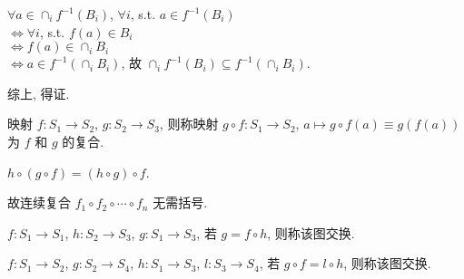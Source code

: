 \documentclass{note}
\begin{document}
\begin{itemize}
\begin{pf}
        $\forall a\in\cap_if^{-1}(B_i)$, $\forall i$, s.t. $a\in f^{-1}(B_i)$\\
        $\Longleftrightarrow\forall i$, s.t. $f(a)\in B_i$\\
        $\Longleftrightarrow f(a)\in\cap_iB_i$\\
        $\Longleftrightarrow a\in f^{-1}(\cap_iB_i)$, 故 $\cap_if^{-1}(B_i)\subseteq f^{-1}(\cap_iB_i)$.

        综上, 得证.
    \end{pf}
\end{itemize}

\begin{df}[映射的复合]
    映射 $f:S_1\rightarrow S_2$, $g:S_2\rightarrow S_3$, 则称映射 $g\circ f:S_1\rightarrow S_2$, $a\mapsto g\circ f(a)\equiv g(f(a))$ 为 $f$ 和 $g$ 的复合.
\end{df}

\begin{thm}[映射复合的结合律]
    $h\circ(g\circ f)=(h\circ g)\circ f$.
\end{thm}

故连续复合 $f_1\circ f_2\circ\cdots\circ f_n$ 无需括号.

\begin{df}[交换图]
    $f: S_1\rightarrow S_1$, $h:S_2\rightarrow S_3$, $g:S_1\rightarrow S_3$, 若 $g=f\circ h$, 则称该图交换.
    \begin{center}
    \end{center}

    $f:S_1\rightarrow S_2$, $g:S_2\rightarrow S_4$, $h:S_1\rightarrow S_3$, $l:S_3\rightarrow S_4$, 若 $g\circ f=l\circ h$, 则称该图交换.
    \begin{center}
    \end{center}
\end{df}
\end{document}
